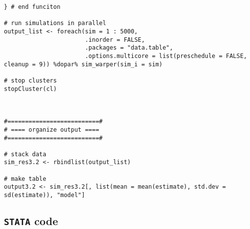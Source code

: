 \documentclass[12pt]{article}
\begin{document}
\begin{verbatim}
} # end funciton 

# run simulations in parallel
output_list <- foreach(sim = 1 : 5000,
                       .inorder = FALSE,
                       .packages = "data.table",
                       .options.multicore = list(preschedule = FALSE, cleanup = 9)) %dopar% sim_warper(sim_i = sim)

# stop clusters 
stopCluster(cl)



#==========================#
# ==== organize output ====
#==========================#

# stack data 
sim_res3.2 <- rbindlist(output_list)

# make table 
output3.2 <- sim_res3.2[, list(mean = mean(estimate), std.dev = sd(estimate)), "model"]

\end{verbatim}

\subsection{\texttt{STATA} code}
\end{document}
